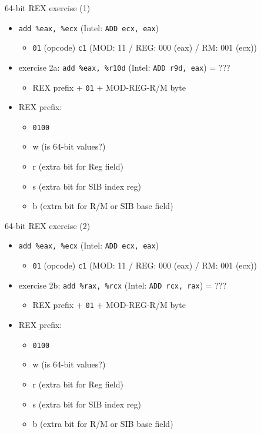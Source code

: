 \begin{frame}{64-bit REX exercise (1)}
    \begin{itemize}
    \item \texttt{add \%eax, \%ecx} (Intel: {\tt ADD ecx, eax})
        \begin{itemize}
        \item {\tt 01} (opcode) {\tt c1} (MOD: 11 / REG: 000 (eax) / R\/M: 001 (ecx))
        \end{itemize}
    \item exercise 2a: \texttt{add \%eax, \%r10d} (Intel: {\tt ADD r9d, eax}) = ???
        \begin{itemize}
        \item REX prefix + {\tt 01} + MOD-REG-R/M byte
        \end{itemize}
    \vspace{.5cm}
    \item REX prefix:
        \begin{itemize}
        \item {\tt 0100}
        \item w (is 64-bit values?)
        \item r (extra bit for Reg field)
        \item s (extra bit for SIB index reg)
        \item b (extra bit for R/M or SIB base field)
        \end{itemize}
    \end{itemize}
\end{frame}

\begin{frame}{64-bit REX exercise (2)}
    \begin{itemize}
    \item \texttt{add \%eax, \%ecx} (Intel: {\tt ADD ecx, eax})
        \begin{itemize}
        \item {\tt 01} (opcode) {\tt c1} (MOD: 11 / REG: 000 (eax) / R\/M: 001 (ecx))
        \end{itemize}
    \item exercise 2b: \texttt{add \%rax, \%rcx} (Intel: {\tt ADD rcx, rax}) = ???
        \begin{itemize}
        \item REX prefix + {\tt 01} + MOD-REG-R/M byte
        \end{itemize}
    \vspace{.5cm}
    \item REX prefix:
        \begin{itemize}
        \item {\tt 0100}
        \item w (is 64-bit values?)
        \item r (extra bit for Reg field)
        \item s (extra bit for SIB index reg)
        \item b (extra bit for R/M or SIB base field)
        \end{itemize}
    \end{itemize}
\end{frame}
